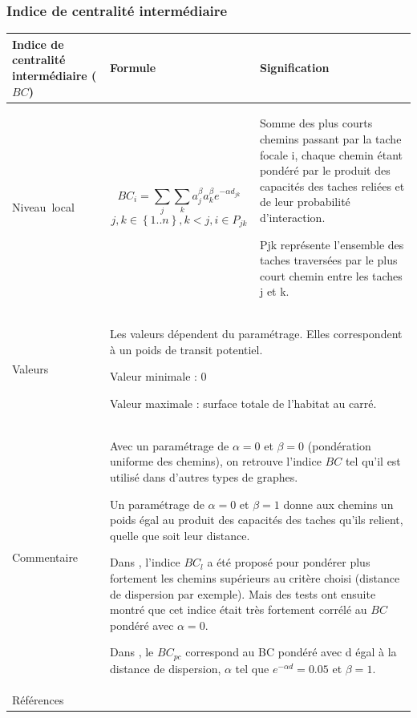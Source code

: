 \documentclass{article}
\begin{document}
\subsubsection{Indice de centralité intermédiaire}
\label{metric_BC}
\begin{table}[H]
\begin{tabular}{|m{3.24cm}|m{4.4810004cm}m{7.924cm}|}
\hline
Indice de centralité intermédiaire ($BC$) &
\multicolumn{1}{m{4.4810004cm}|}{Formule} &
Signification\\\hline
Niveau~local &
\multicolumn{1}{m{4.4810004cm}|}{\begin{equation*}
{\mathit{BC}}_{i}=\sum _{j}{\sum _{k}{{a}_{j}^{\beta }}}{a}_{k}^{\beta }{e}^{-\alpha {d}_{\mathit{jk}}}
\end{equation*}
\begin{equation*}
j,k{\in}\left\{1..n\right\},k<j,i{\in}{P}_{\mathit{jk}}
\end{equation*}
} &
Somme des plus courts chemins passant par la tache focale i, chaque chemin étant pondéré par le produit des capacités des taches reliées et de leur probabilité d’interaction.

Pjk représente l’ensemble des taches traversées par le plus court chemin entre les taches j et k.

\\\hline
Valeurs &
\multicolumn{2}{m{12.6050005cm}|}{Les valeurs dépendent du paramétrage. Elles correspondent à un poids de transit potentiel.

Valeur minimale : 0

Valeur maximale : surface totale de l’habitat au carré.

}\\\hline
Commentaire &
\multicolumn{2}{m{12.6050005cm}|}{Avec un paramétrage de $\alpha=0$ et $\beta =0$ (pondération uniforme des chemins), on retrouve l’indice $BC$ tel qu’il est utilisé dans d’autres types de graphes.

Un paramétrage de $\alpha=0$ et $\beta=1$ donne aux chemins un poids égal au produit des capacités des taches qu’ils relient, quelle que soit leur distance.

Dans \cite{2012_graphab_EMS, 2012_SDM}, l’indice $BC_l$ a été proposé pour pondérer plus fortement les chemins supérieurs au critère choisi (distance de dispersion par exemple). Mais des tests ont ensuite montré que cet indice était très fortement corrélé au $BC$ pondéré avec $\alpha=0$.

Dans \cite{Bodin2010}, le  ${\mathit{BC}}_{\mathit{pc}}$ correspond au BC pondéré avec d égal à la distance de dispersion,   $\alpha $ tel que  ${e}^{-\mathit{\alpha d}}=0.05$ et  $\beta=1$.

}\\\hline
Références &
\multicolumn{2}{m{12.6050005cm}|}{
\cite{Bodin2010}
\cite{2012_graphab_EMS}

}\\\hline
\end{tabular}
\end{table}
\end{document}
